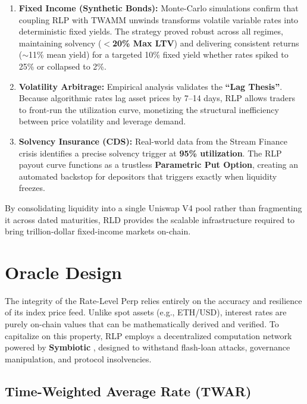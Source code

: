 \documentclass[12pt]{article}
\begin{document}
\begin{enumerate}
    \item \textbf{Fixed Income (Synthetic Bonds):} Monte-Carlo simulations confirm that coupling RLP with TWAMM unwinds transforms volatile variable rates into deterministic fixed yields. The strategy proved robust across all regimes, maintaining solvency (\textbf{$<$20\% Max LTV}) and delivering consistent returns ($\sim$11\% mean yield) for a targeted 10\% fixed yield whether rates spiked to 25\% or collapsed to 2\%.
    \item \textbf{Volatility Arbitrage:} Empirical analysis validates the \textbf{``Lag Thesis''}. Because algorithmic rates lag asset prices by 7--14 days, RLP allows traders to front-run the utilization curve, monetizing the structural inefficiency between price volatility and leverage demand.
    \item \textbf{Solvency Insurance (CDS):} Real-world data from the Stream Finance crisis identifies a precise solvency trigger at \textbf{95\% utilization}. The RLP payout curve functions as a trustless \textbf{Parametric Put Option}, creating an automated backstop for depositors that triggers exactly when liquidity freezes.
\end{enumerate}

By consolidating liquidity into a single Uniswap V4 pool rather than fragmenting it across dated maturities, RLD provides the scalable infrastructure required to bring trillion-dollar fixed-income markets on-chain.

\newpage



\appendix
\section{Oracle Design}

The integrity of the Rate-Level Perp relies entirely on the accuracy and resilience of its index price feed. Unlike spot assets (e.g., ETH/USD), interest rates are purely on-chain values that can be mathematically derived and verified. To capitalize on this property, RLP employs a decentralized computation network powered by \textbf{Symbiotic} \cite{symbiotic2024restaking}, designed to withstand flash-loan attacks, governance manipulation, and protocol insolvencies.

\subsection{Time-Weighted Average Rate (TWAR)}
\end{document}
